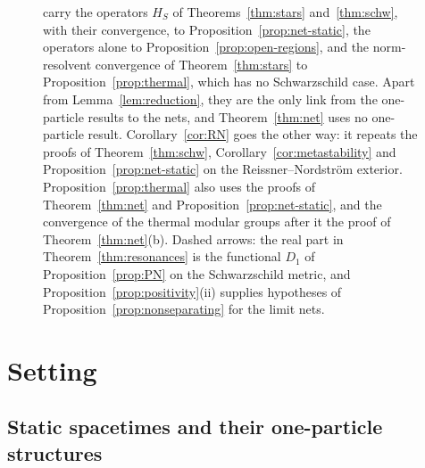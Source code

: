 \documentclass[%
 aip,
 jmp,
 amsmath,amssymb,
 reprint, onecolumn
]{revtex4-1}
\theoremstyle{definition}
\theoremstyle{remark}
\begin{document}
\begin{figure}[htb]
{carry the operators $H_S$ of Theorems~\ref{thm:stars}
and~\ref{thm:schw}, with their convergence, to
Proposition~\ref{prop:net-static}, the operators alone to
Proposition~\ref{prop:open-regions}, and the norm-resolvent convergence
of Theorem~\ref{thm:stars} to Proposition~\ref{prop:thermal}, which has
no Schwarzschild case. Apart from Lemma~\ref{lem:reduction}, they are
the only link from the one-particle results to the nets, and
Theorem~\ref{thm:net} uses no one-particle result.
Corollary~\ref{cor:RN} goes the other way: it repeats the proofs of
Theorem~\ref{thm:schw}, Corollary~\ref{cor:metastability} and
Proposition~\ref{prop:net-static} on the Reissner--Nordstr\"om
exterior. Proposition~\ref{prop:thermal} also uses the proofs of
Theorem~\ref{thm:net} and Proposition~\ref{prop:net-static}, and the
convergence of the thermal modular groups after it the proof of
Theorem~\ref{thm:net}(b). Dashed
arrows: the real part in Theorem~\ref{thm:resonances} is the functional
$D_1$ of Proposition~\ref{prop:PN} on the Schwarzschild metric, and
Proposition~\ref{prop:positivity}(ii) supplies hypotheses of
Proposition~\ref{prop:nonseparating} for the limit nets.}
\label{fig:structure}
\end{figure}


\section{Setting}\label{sec:setting}

\subsection{Static spacetimes and their one-particle structures}
\label{sec:one-particle}
\end{document}
